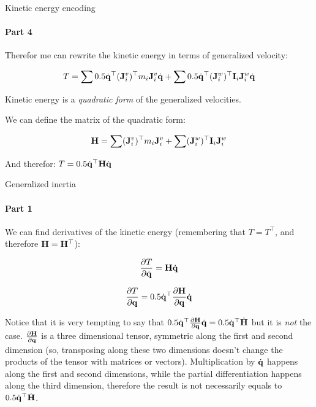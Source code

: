 \documentclass{beamer}
\begin{document}
\begin{frame}{Kinetic energy encoding}
	\framesubtitle{Part 4}
	\begin{flushleft}
		
		
		Therefor me can rewrite the kinetic energy in terms of generalized velocity:
		
		\begin{equation}
			T = \sum 0.5 \dot{\mathbf{q}}^\top (\mathbf{J}^v_i)^\top m_i \mathbf{J}^v_i \dot{\mathbf{q}} 
			+ 
			\sum 0.5 \dot{\mathbf{q}}^\top (\mathbf{J}^w_i)^\top \mathbf{I}_i \mathbf{J}^w_i \dot{\mathbf{q}} 
		\end{equation}
		
		Kinetic energy is a \emph{quadratic form} of the generalized velocities.
		
		We can define the matrix of the quadratic form:
		
		\begin{equation}
			\label{eq:JSIM}
			\mathbf{H} = \sum (\mathbf{J}^v_i)^\top m_i \mathbf{J}^v_i 
			+ 
			\sum (\mathbf{J}^w_i)^\top \mathbf{I}_i \mathbf{J}^w_i 
		\end{equation}
		
		\bigskip
		
		And therefor: $T = 0.5 \dot{\mathbf{q}}^\top \mathbf{H} \dot{\mathbf{q}}$
		
	\end{flushleft}
\end{frame}




\begin{frame}{Generalized inertia}
	\framesubtitle{Part 1}
	\begin{flushleft}
		
		
		We can find derivatives of the kinetic energy (remembering that $T = T^\top$, and therefore $\mathbf{H} = \mathbf{H}^\top$):
		
		\begin{equation}
			\frac{\partial T }{\partial \dot{\mathbf{q}}} = 
			\mathbf{H} \dot{\mathbf{q}}
		\end{equation}
		
		\begin{equation}
			\frac{\partial T }{\partial \mathbf{q}} = 
			0.5 \dot{\mathbf{q}}^\top \frac{\partial \mathbf{H} }
			{\partial \mathbf{q}} \dot{\mathbf{q}}
		\end{equation}
		
		
		Notice that it is very tempting to say that $0.5 \dot{\mathbf{q}}^\top \frac{\partial \mathbf{H} }
		{\partial \mathbf{q}} \dot{\mathbf{q}}
		=
		0.5 \dot{\mathbf{q}}^\top \dot{ \mathbf{H} }$ but it is \emph{not} the case. $\frac{\partial \mathbf{H} }
		{\partial \mathbf{q}}$ is a three dimensional tensor, symmetric along the first and second dimension (so, transposing along these two dimensions doesn't change the products of the tensor with matrices or vectors). Multiplication by $\dot{\mathbf{q}}$ happens along the first and second dimensions, while the partial differentiation happens along the third dimension, therefore the result is not necessarily equals to $0.5 \dot{\mathbf{q}}^\top \dot{ \mathbf{H} }$. 
		
	\end{flushleft}
\end{frame}
\end{document}
